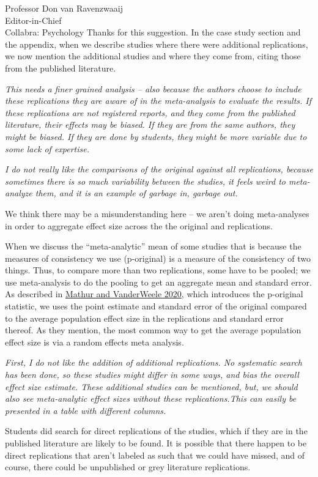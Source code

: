 \documentclass{stanfordletter}
\newcounter{section}
\newcommand{\theysaid}[1]{\begin{leftbar} \noindent 
		\textsl{ #1}\end{leftbar}}
\begin{document}
\begin{letter}{Professor Don van Ravenzwaaij \\ Editor-in-Chief \\ Collabra: Psychology }
	Thanks for this suggestion. In the case study section and the appendix, when we describe studies where there were additional replications, we now mention the additional studies and where they come from, citing those from the published literature. 
	
	
	\theysaid{This needs a finer grained analysis – also because the authors choose to include these replications they are aware of in the meta-analysis to evaluate the results. If these replications are not registered reports, and they come from the published literature, their effects may be biased. If they are from the same authors, they might be biased. If they are done by students, they might be more variable due to some lack of expertise.}
	
	\theysaid{I do not really like the comparisons of the original against all replications, because sometimes there is so much variability between the studies, it feels weird to meta-analyze them, and it is an example of garbage in, garbage out.}
	
	We think there may be a misunderstanding here -- we aren't doing meta-analyses in order to aggregate effect size across the the original and replications. 
	
	When we discuss the ``meta-analytic'' mean of some studies that is because the measures of consistency we use (p-original) is a measure of the consistency of two things. Thus, to compare more than two replications, some have to be pooled; we use meta-analysis to do the pooling to get an aggregate mean and standard error. As described in \href{https://rss.onlinelibrary.wiley.com/doi/full/10.1111/rssa.12572}{Mathur and VanderWeele 2020}, which introduces the p-original statistic, we uses the point estimate and standard error of the original compared to the average population effect size in the replications and standard error thereof. As they mention, the most common way to get the average population effect size is via a random effects meta analysis. 
	
	\theysaid{First, I do not like the addition of additional replications. No systematic search has been done, so these studies might differ in some ways, and bias the overall effect size estimate. These additional studies can be mentioned, but, we should also see meta-analytic effect sizes without these replications.This can easily be presented in a table with different columns.}
	
	Students did search for direct replications of the studies, which if they are in the published literature are likely to be found. It is possible that there happen to be direct replications that aren't labeled as such that we could have missed, and of course, there could be unpublished or grey literature replications. 
	

\end{letter}
\end{document}

